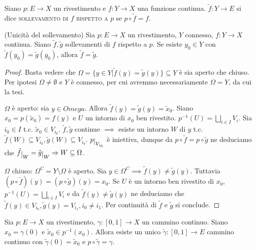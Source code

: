 \begin{defn}
  Siano $p: E \rightarrow X$ un rivestimento e $f: Y \rightarrow X$ una funzione continua. $\tilde{f}: Y \rightarrow E$ si dice \textsc{sollevamento di $f$ rispetto a $p$} se $p \circ \tilde{f}=f$.
\end{defn}

\begin{prop} \label{unic_soll}
  (Unicità del sollevamento)
  Sia $p: E \rightarrow X$ un rivestimento, $Y$ connesso, $f: Y \rightarrow X$ continua. Siano $\tilde{f}, \tilde{g}$ sollevamenti di $f$ rispetto a $p$. Se esiste $y_0 \in Y$ con $\tilde{f}(y_0)=\tilde{g}(y_0)$, allora $\tilde{f}=\tilde{g}$.
\end{prop}

\begin{proof}
  Basta vedere che $\Omega=\{ y \in Y | \tilde{f}(y)=\tilde{g}(y)\} \subseteq Y$ è sia aperto che chiuso. Per ipotesi $\Omega \not= \emptyset$ e $Y$ è connesso, per cui avremmo necessariamente $\Omega=Y$, da cui la tesi.

  $\Omega$ è aperto: sia $y \in Omega$. Allora $\tilde{f}(y)=\tilde{g}(y)=\tilde{x}_0$. Siano $x_0=p(\tilde{x}_0)=f(y)$ e $U$ un intorno di $x_0$ ben rivestito.
  $\displaystyle p^{-1}(U)=\bigsqcup_{i \in I} V_i$. Sia $i_0 \in I$ t.c. $\tilde{x}_0 \in V_{i_0}$.
  $\tilde{f}, \tilde{g}$ continue $\implies$ esiste un intorno $W$ di $y$ t.c. $\tilde{f}(W) \subseteq V_{i_0}, \tilde{g}(W) \subseteq V_{i_0}$.
  $p \restrict{V_{i_0}}$ è iniettiva, dunque da $p \circ \tilde{f}=p \circ \tilde{g}$ ne deduciamo che $\tilde{f} \restrict{W}=\tilde{g} \restrict{W} \implies W \subseteq \Omega$.

  $\Omega$ chiuso: $\Omega^C=Y \setminus \Omega$ è aperto. Sia $y \in \Omega^C \implies \tilde{f}(y) \not= \tilde{g}(y)$. Tuttavia $(p \circ \tilde{f})(y)=(p \circ \tilde{g})(y)=x_0$.
  Se $U$ è un intorno ben rivestito di $x_0$, $\displaystyle p^{-1}(U)=\bigsqcup_{i \in I} V_i$ e da $\tilde{f}(y) \not= \tilde{g}(y)$ ne deduciamo che $\tilde{f}(y) \in V_{i_0}, \tilde{g}(y)=V_{i_1}, i_0 \not= i_1$. Per continuità di $\tilde{f}$ e $\tilde{g}$ si conclude.
\end{proof}

\begin{thm}
  Sia $p:E \rightarrow X$ un rivestimento, $\gamma:[0, 1] \rightarrow X$ un cammino continuo. Siano $x_0=\gamma(0)$ e $\tilde{x}_0 \in p^{-1}(x_0)$.
  Allora esiste un unico $\tilde{\gamma}:[0, 1] \rightarrow E$ cammino continuo con $\tilde{\gamma}(0)=\tilde{x}_0$ e $p \circ \tilde{\gamma}=\gamma$.
\end{thm}


